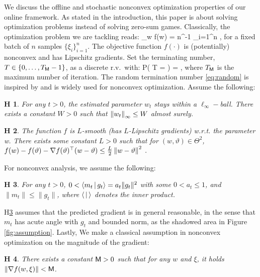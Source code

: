 \documentclass[twoside]{article}
\newtheorem{assumption}{H\!\!}
\begin{document}
We discuss the offline and stochastic nonconvex optimization properties of our online framework.
As stated in the introduction, this paper is about solving optimization problems instead of solving zero-sum games.  
Classically, the optimization problem we are tackling reads:
\beq\label{eq:minproblem}
\min \limits_{w \in \Theta} f(w) \eqdef  \EE[ f(w, \xi)] = n^{-1} \sum_{i=1}^n  \EE[f(w, \xi_i)] \eqsp,
\eeq
for a fixed batch of $n$ samples $\{ \xi_i \}_{i=1}^n$.
The objective function $f(\cdot)$ is (potentially) nonconvex and has Lipschitz gradients.
Set the terminating number, $T \in \{0,\dots,T_{\sf M}-1\}$, as a discrete r.v.~with:
\beq \label{eq:random}
   P( T = \ell ) =  \eqsp,
\eeq
where $T_{\sf M}$ is the maximum number of iteration.
The random termination number \eqref{eq:random} is inspired by \citep{ghadimi2013stochastic} and is widely used for nonconvex optimization. 
Assume the following:
\begin{assumption}\label{ass:boundedparam}
For any $t >0$, the estimated parameter $w_t$ stays within a $\ell_{\infty}-$ball. There exists a constant $W >0$ such that $\left\Vert w_t \right\Vert_{\infty} \leq W$ almost surely.
\end{assumption}
\begin{assumption}\label{ass:smooth}
The function $f$ is $L$-smooth (has $L$-Lipschitz gradients) w.r.t. the parameter w.
There exists some constant $L > 0$ such that for $(w, \vartheta) \in \Theta^2$, $f(w) - f(\vartheta) - \nabla f(\vartheta)^\top(w - \vartheta) \leq \frac{L}{2} \left\Vert w - \vartheta \right\Vert^2\;.$
\end{assumption}
For nonconvex analysis, we assume the following:
\begin{assumption}\label{ass:guessbound}
For any $t >0$, $0 < \left\langle m_t\,|\, g_t \right\rangle = a_t \|g_t\|^2$ with some $0<a_t\leq 1$, and $\| m_t \|\leq \| g_t \|$, where $\left\langle\,|\, \right\rangle$ denotes the inner product.
\end{assumption}
H\ref{ass:guessbound} assumes that the predicted gradient is in general reasonable, in the sense that $m_t$ has acute angle with $g_t$ and bounded norm, as the shadowed area in Figure \ref{fig:assumption}. Lastly, We make a classical assumption in nonconvex optimization on the magnitude of the gradient:
\begin{assumption}\label{ass:bounded}
There exists a constant $\mathsf{M} >0$ such that for any $w$ and $\xi$, it holds $\left\Vert \nabla f(w, \xi) \right\Vert < \mathsf{M}$.
\end{assumption}
\end{document}
